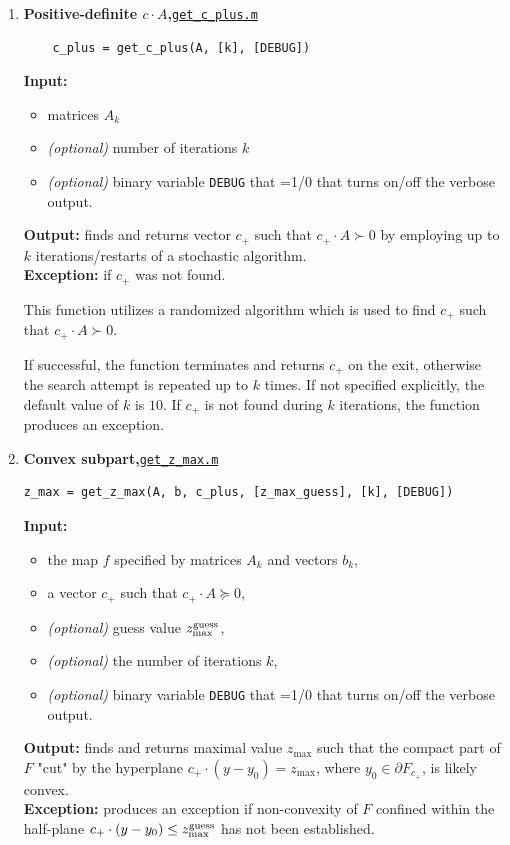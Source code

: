 \documentclass[a4paper]{article}
\theoremstyle{definition}
\begin{document}
\begin{enumerate}
{\bf Exceptions:} None.

	
This function calls {\tt get\_c\_minus} and returns  {\tt is\_nonconvex}=$1$ if the latter returns a non-trivial $c$. 


\item {\bf Positive-definite $c\cdot A$,\hskip 6pt}\underline{\tt get\_c\_plus.m}
\begin{verbatim}
	c_plus = get_c_plus(A, [k], [DEBUG])
\end{verbatim}

{\bf Input:}
\begin{itemize}
	\item matrices $A_k$
	\item {\it (optional)} number of iterations $k$
	\item {\it (optional)} binary variable {\tt DEBUG} that =1/0 that turns on/off the verbose output.
\end{itemize}
{\bf Output:} finds and returns vector $c_+$ such that $c_+\cdot A\succ 0$ by employing up to $k$ iterations/restarts of a stochastic algorithm.\\
{\bf Exception:} if $c_+$  was not found.
	
This function utilizes a randomized algorithm which is used to find $c_+$ such that $c_+\cdot A\succ 0$.

If successful, the function terminates and returns $c_+$ on the exit, otherwise the search attempt is repeated up to $k$ times.
If not specified explicitly, the default value of $k$ is $10$.
If $c_+$ is not found during $k$ iterations, the function produces an exception.

	
\item {\bf Convex subpart,\hskip 6pt}\underline{\tt get\_z\_max.m}
\begin{verbatim}
z_max = get_z_max(A, b, c_plus, [z_max_guess], [k], [DEBUG])
\end{verbatim}
{\bf Input:}
\begin{itemize}
	\item the map $f$ specified by matrices $A_k$ and vectors $b_k$,
	\item a vector $c_+$ such that $c_+\cdot A\succeq 0$,
	\item {\it (optional)}  guess value  $z^{\rm guess}_{\rm max}$,
	\item {\it (optional)} the number of iterations $k$,
	\item {\it (optional)}  binary variable {\tt DEBUG} that =1/0 that turns on/off the verbose output.
\end{itemize}
{\bf Output:} finds and returns maximal value $z_{\max}$ such that the compact part of $F$ "cut" by the hyperplane  $c_+ \cdot (y-y_0)=z_{\max}$, where $y_0\in \partial F_{c_+}$, is  likely convex. \\
{\bf Exception:} produces an exception if non-convexity of $F$ confined within the half-plane $c_+ \cdot (y-y_0)\leq z^{\rm guess}_{\rm max}$  has not been established.


\end{enumerate}
\end{document}
